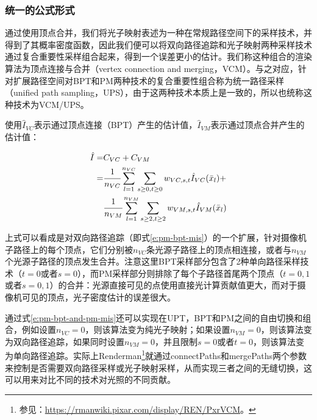 \subsubsection{统一的公式形式}
通过使用顶点合并，我们将光子映射表述为一种在常规路径空间下的采样技术，并得到了其概率密度函数，因此我们便可以将双向路径追踪和光子映射两种采样技术通过复合重要性采样组合起来，得到一个误差更小的估计。我们称这种组合的渲染算法为顶点连接与合并（vertex connection and merging，VCM）。与之对应，\cite{a:APathSpaceExtensionforRobustLightTransportSimulation}针对扩展路径空间对BPT和PM两种技术的复合重要性组合称为统一路径采样（unified path sampling，UPS），由于这两种技术本质上是一致的，所以也统称这种技术为VCM/UPS。

使用$\hat{I}_{VC}$表示通过顶点连接（BPT）产生的估计值，$\hat{I}_{VM}$表示通过顶点合并产生的估计值：

\begin{equation}\label{e:pm-bpt-and-pm-mis}
\begin{aligned}	
	\hat{I}=&C_{VC}+C_{VM}\\
		   =& \cfrac{1}{n_{VC}}\sum^{n_{VC}}_{l=1}\sum_{s\geq 0,t\geq 0}w_{VC,s,t}\hat{I}_{VC}(\bar{x}_l)+\\
		   & \cfrac{1}{n_{VM}}\sum^{n_{VM}}_{l=1}\sum_{s\geq 2,t\geq 2}w_{VM,s,t}\hat{I}_{VM}(\bar{x}_l)
\end{aligned}
\end{equation}

\noindent 上式可以看成是对双向路径追踪\cite{a:RobustMonteCarloMethodsforLightTransportSimulation}（即式\ref{e:pm-bpt-mis}）的一个扩展，针对摄像机子路径上的每个顶点，它们分别被$n_{VC}$条光源子路径上的顶点相连接，或者与$n_{VM}$个光源子路径的顶点发生合并。注意这里BPT采样部分包含了2种单向路径采样技术（$t=0$或者$s=0$），而PM采样部分则排除了每个子路径首尾两个顶点（$t=0,1$或者$s=0,1$）的合并：光源直接可见的点使用直接光计算贡献值更大，而对于摄像机可见的顶点，光子密度估计的误差很大。

通过式\ref{e:pm-bpt-and-pm-mis}还可以实现在UPT，BPT和PM之间的自由切换和组合，例如设置$n_{VC}=0$，则该算法变为纯光子映射；如果设置$n_{VM}=0$，则该算法变为双向路径追踪，如果同时设置$n_{VM}=0$，并且限制$s=0$或者$t=0$，则该算法变为单向路径追踪。实际上Renderman\footnote{参见：\url{https://rmanwiki.pixar.com/display/REN/PxrVCM}。}就通过connectPaths和mergePaths两个参数来控制是否需要双向路径采样或光子映射采样，从而实现三者之间的无缝切换，这可以用来对比不同的技术对光照的不同贡献。

